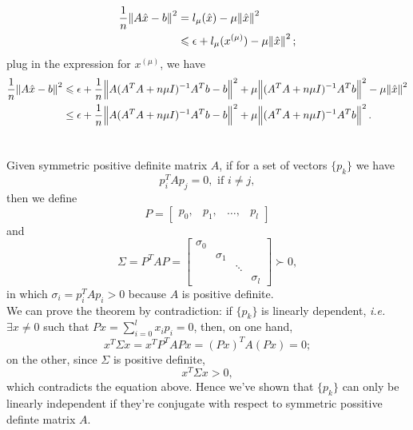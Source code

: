 \documentclass[11pt]{article}
\begin{document}
\subsection{}
\begin{equation}\begin{split}
\frac1n\norm{A\hat x-b}^2 &= l_{\mu}(\hat x)-\mu\norm{\hat x}^2 \\
&\leqslant \epsilon+l_{\mu}(x^{(\mu)})- \mu\norm{\hat x}^2;
\end{split}\nonumber\end{equation}
plug in the expression for $x^{(\mu)}$, we have
\begin{equation}\begin{split} 
\frac1n\norm{A\hat x - b}^2 &\leqslant \epsilon +\frac1n \norm{A(A^TA+n\mu I)^{-1}A^Tb-b}^2+\mu\norm{(A^TA+n\mu I)^{-1}A^Tb}^2-\mu\norm{\hat x}^2\\
&\leq \epsilon +\frac1n \norm{A(A^TA+n\mu I)^{-1}A^Tb-b}^2+\mu\norm{(A^TA+n\mu I)^{-1}A^Tb}^2.
\end{split}\nonumber\end{equation} 


\section{}
Given symmetric positive definite matrix $A$, if for a set of vectors $\{p_k\}$ we have 
$$p_i^TAp_j=0,\,\,\text{if}\,\,i\neq j,$$
then we define
$$P = \begin{bmatrix} p_0, & p_1, & \dots ,& p_l\end{bmatrix} $$
and
$$\Sigma = P^TAP = \begin{bmatrix} \sigma_0 \\ & \sigma_1 \\ & & \ddots \\ & & & \sigma_l \end{bmatrix}\succ0, $$
in which $\sigma_i = p_i^TAp_i > 0$ because $A$ is positive definite.\\[0.4cm]
We can prove the theorem by contradiction: if $\{p_k\}$ is linearly dependent, \textit{i.e.} $\exists x \neq 0$ such that $Px = \sum_{i=0}^lx_ip_i=0$, then, on one hand, 
\begin{equation} 
x^T\Sigma x = x^TP^TAPx = (Px)^TA(Px) = 0;
\nonumber\end{equation} 
on the other, since $\Sigma$ is positive definite, 
$$x^T\Sigma x > 0,$$
which contradicts the equation above. Hence we've shown that $\{p_k\}$ can only be linearly independent if they're conjugate with respect to symmetric possitive definte matrix $A$.
\end{document}

